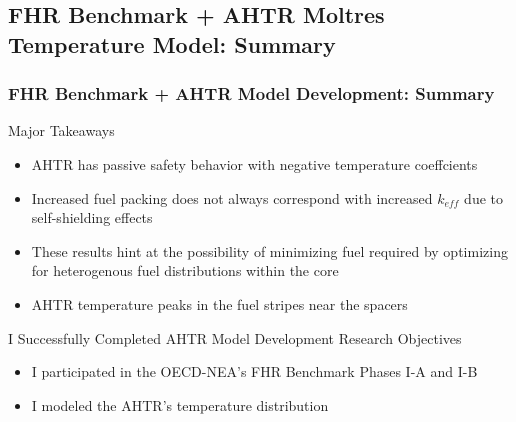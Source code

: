 \subsection{FHR Benchmark + AHTR Moltres Temperature Model: Summary}
\begin{frame}
    \frametitle{FHR Benchmark + AHTR Model Development: Summary}
    \begin{block}{Major Takeaways}
        \begin{itemize}
            \item AHTR has passive safety behavior with negative temperature coeffcients
            \item Increased fuel packing does not always correspond with increased 
            $k_{eff}$ due to self-shielding effects 
            \item These results hint at the possibility of minimizing fuel required by 
            optimizing for heterogenous fuel distributions within the core
            \item AHTR temperature peaks in the fuel stripes near the spacers 
        \end{itemize}
    \end{block}
    \begin{block}{I Successfully Completed AHTR Model Development Research Objectives}
        \begin{itemize}
            \item I participated in the OECD-NEA's FHR Benchmark Phases I-A and I-B
            \item I modeled the \gls{AHTR}'s temperature distribution 
        \end{itemize}
    \end{block}
\end{frame}
